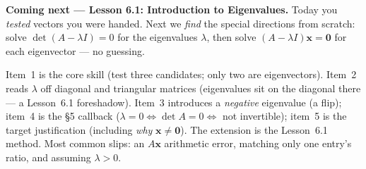 \documentclass[10pt]{article}
\newcommand{\xx}{\mathbf{x}}
\newcommand{\zero}{\mathbf{0}}
\begin{document}
\begin{spiralbox}
\textbf{Coming next --- Lesson 6.1: Introduction to Eigenvalues.} Today you \emph{tested} vectors you
were handed. Next we \emph{find} the special directions from scratch: solve $\det(A-\lambda I)=0$ for
the eigenvalues $\lambda$, then solve $(A-\lambda I)\xx=\zero$ for each eigenvector --- no guessing.
\end{spiralbox}

\begin{teachernote}
Item~1 is the core skill (test three candidates; only two are eigenvectors). Item~2 reads $\lambda$
off diagonal and triangular matrices (eigenvalues sit on the diagonal there --- a Lesson~6.1
foreshadow). Item~3 introduces a \emph{negative} eigenvalue (a flip); item~4 is the §5 callback
($\lambda=0\Leftrightarrow\det A=0\Leftrightarrow$ not invertible); item~5 is the target justification
(including \emph{why} $\xx\ne\zero$). The extension is the Lesson~6.1 method. Most common slips: an
$A\xx$ arithmetic error, matching only one entry's ratio, and assuming $\lambda>0$.
\end{teachernote}
\end{document}
